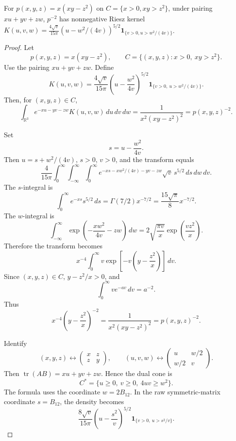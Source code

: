 \begin{lemma}
\label{res:kms-arrowhead-riesz-kernel-pminus2}
For \(p(x,y,z)=x(xy-z^2)\) on \(C=\{x>0,xy>z^2\}\), under pairing \(xu+yv+zw\), \(p^{-2}\) has nonnegative Riesz kernel \(K(u,v,w)=\frac{4\sqrt v}{15\pi}(u-w^2/(4v))^{5/2}\mathbf1_{\{v>0,u>w^2/(4v)\}}\).
\end{lemma}
\begin{proof}
Let
\[
p(x,y,z)=x(xy-z^2),
\qquad
C=\{(x,y,z):x>0,\ xy>z^2\}.
\]
Use the pairing \(xu+yv+zw\). Define
\[
K(u,v,w)=
\frac{4\sqrt v}{15\pi}
\left(u-\frac{w^2}{4v}\right)^{5/2}
\mathbf 1_{\{v>0,\ u>w^2/(4v)\}}.
\]
Then, for \((x,y,z)\in C\),
\[
\int_{\mathbb R^3}e^{-xu-yv-zw}K(u,v,w)\,du\,dv\,dw
=\frac{1}{x^2(xy-z^2)^2}
=p(x,y,z)^{-2}.
\]

Set
\[
s=u-\frac{w^2}{4v}.
\]
Then \(u=s+w^2/(4v)\), \(s>0\), \(v>0\), and the transform equals
\[
\frac{4}{15\pi}\int_0^\infty\int_{-\infty}^{\infty}\int_0^\infty
e^{-xs-xw^2/(4v)-yv-zw}\sqrt v\,s^{5/2}\,ds\,dw\,dv.
\]
The \(s\)-integral is
\[
\int_0^\infty e^{-xs}s^{5/2}\,ds
=\Gamma(7/2)x^{-7/2}
=\frac{15\sqrt\pi}{8}x^{-7/2}.
\]
The \(w\)-integral is
\[
\int_{-\infty}^{\infty}\exp\left(-\frac{xw^2}{4v}-zw\right)\,dw
=2\sqrt{\frac{\pi v}{x}}\exp\left(\frac{vz^2}{x}\right).
\]
Therefore the transform becomes
\[
x^{-4}\int_0^\infty v\exp\left[-v\left(y-\frac{z^2}{x}\right)\right]\,dv.
\]
Since \((x,y,z)\in C\), \(y-z^2/x>0\), and
\[
\int_0^\infty ve^{-av}\,dv=a^{-2}.
\]
Thus
\[
x^{-4}\left(y-\frac{z^2}{x}\right)^{-2}
=\frac{1}{x^2(xy-z^2)^2}
=p(x,y,z)^{-2}.
\]

Identify
\[
(x,y,z)\leftrightarrow
\begin{pmatrix}x&z\\ z&y\end{pmatrix},
\qquad
(u,v,w)\leftrightarrow
\begin{pmatrix}u&w/2\\ w/2&v\end{pmatrix}.
\]
Then \(\operatorname{tr}(AB)=xu+yv+zw\). Hence the dual cone is
\[
C^*=\{u\ge0,\ v\ge0,\ 4uv\ge w^2\}.
\]
The formula uses the coordinate \(w=2B_{12}\). In the raw symmetric-matrix coordinate \(s=B_{12}\), the density becomes
\[
\frac{8\sqrt v}{15\pi}
\left(u-\frac{s^2}{v}\right)^{5/2}
\mathbf 1_{\{v>0,\ u>s^2/v\}}.
\]
\end{proof}

